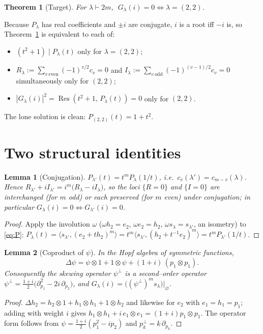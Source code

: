 \documentclass[11pt]{article}
\newtheorem{theorem}{Theorem}
\newtheorem{lemma}{Lemma}
\theoremstyle{definition}
\DeclareMathOperator{\Res}{Res}
\newcommand{\la}{\lambda}
\newcommand{\sll}{s_\la}
\newcommand{\inner}[2]{\langle #1,#2\rangle}
\begin{document}
\begin{theorem}[Target]\label{thm:target}
For $\la\vdash 2m$, $\;G_\la(i)=0\iff\la=(2,2)$.
\end{theorem}

Because $P_\la$ has real coefficients and $\pm i$ are conjugate, $i$ is a root iff
$-i$ is, so Theorem~\ref{thm:target} is equivalent to each of:
\begin{itemize}
\item $(t^2+1)\mid P_\la(t)$ only for $\la=(2,2)$;
\item $R_\la:=\sum_{v\ \mathrm{even}}(-1)^{v/2}c_v=0$ and
      $I_\la:=\sum_{v\ \mathrm{odd}}(-1)^{(v-1)/2}c_v=0$ simultaneously only for $(2,2)$;
\item $|G_\la(i)|^2=\Res(t^2+1,\,P_\la(t))=0$ only for $(2,2)$.
\end{itemize}
The lone solution is clean: $P_{(2,2)}(t)=1+t^2$.

\section{Two structural identities}

\begin{lemma}[Conjugation]\label{lem:conj}
$P_{\la'}(t)=t^m P_\la(1/t)$, i.e.\ $c_v(\la')=c_{m-v}(\la)$.  Hence
$R_{\la'}+iI_{\la'}=i^m\bigl(R_\la-iI_\la\bigr)$, so the loci $\{R=0\}$ and
$\{I=0\}$ are interchanged (for $m$ odd) or each preserved (for $m$ even) under
conjugation; in particular $G_\la(i)=0\iff G_{\la'}(i)=0$.
\end{lemma}
\begin{proof}
Apply the involution $\omega$ ($\omega h_2=e_2$, $\omega e_2=h_2$, $\omega\sll=s_{\la'}$,
an isometry) to \eqref{eq:P}: $P_\la(t)=\inner{s_{\la'}}{(e_2+t h_2)^m}
=t^m\inner{s_{\la'}}{(h_2+t^{-1}e_2)^m}=t^m P_{\la'}(1/t)$.
\end{proof}

\begin{lemma}[Coproduct of $\psi$]\label{lem:cop}
In the Hopf algebra of symmetric functions,
\[
\Delta\psi=\psi\otimes1+1\otimes\psi+(1+i)\,(p_1\otimes p_1).
\]
Consequently the skewing operator $\psi^\perp$ is a second--order operator
$\psi^\perp=\tfrac{1+i}{2}\bigl(\partial_{p_1}^2-2i\,\partial_{p_2}\bigr)$, and
$G_\la(i)=\bigl((\psi^\perp)^m\sll\bigr)\big|_{\varnothing}$.
\end{lemma}
\begin{proof}
$\Delta h_2=h_2\otimes1+h_1\otimes h_1+1\otimes h_2$ and likewise for $e_2$ with
$e_1=h_1=p_1$; adding with weight $i$ gives $h_1\otimes h_1+i\,e_1\otimes e_1
=(1+i)p_1\otimes p_1$.  The operator form follows from
$\psi=\tfrac{1+i}{2}(p_1^2-ip_2)$ and $p_k^\perp=k\,\partial_{p_k}$.
\end{proof}
\end{document}

